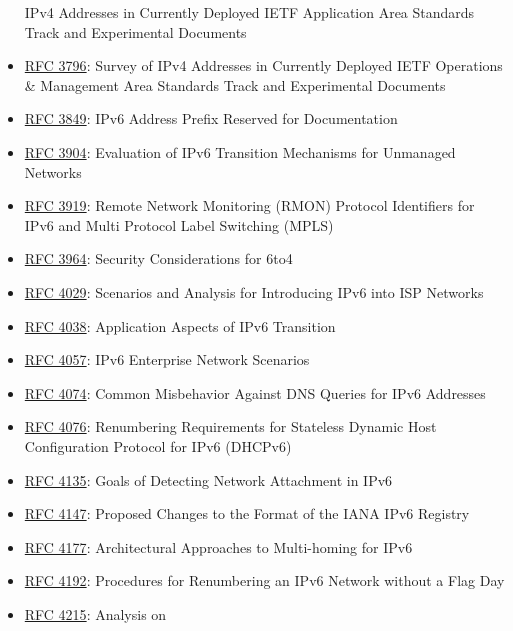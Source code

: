 \documentclass[
]{article}
\begin{document}
\begin{itemize}
  IPv4 Addresses in Currently Deployed IETF Application Area Standards
  Track and Experimental Documents
\item
  \href{https://www.rfc-editor.org/info/rfc3796}{RFC 3796}: Survey of
  IPv4 Addresses in Currently Deployed IETF Operations \& Management
  Area Standards Track and Experimental Documents
\item
  \href{https://www.rfc-editor.org/info/rfc3849}{RFC 3849}: IPv6 Address
  Prefix Reserved for Documentation
\item
  \href{https://www.rfc-editor.org/info/rfc3904}{RFC 3904}: Evaluation
  of IPv6 Transition Mechanisms for Unmanaged Networks
\item
  \href{https://www.rfc-editor.org/info/rfc3919}{RFC 3919}: Remote
  Network Monitoring (RMON) Protocol Identifiers for IPv6 and Multi
  Protocol Label Switching (MPLS)
\item
  \href{https://www.rfc-editor.org/info/rfc3964}{RFC 3964}: Security
  Considerations for 6to4
\item
  \href{https://www.rfc-editor.org/info/rfc4029}{RFC 4029}: Scenarios
  and Analysis for Introducing IPv6 into ISP Networks
\item
  \href{https://www.rfc-editor.org/info/rfc4038}{RFC 4038}: Application
  Aspects of IPv6 Transition
\item
  \href{https://www.rfc-editor.org/info/rfc4057}{RFC 4057}: IPv6
  Enterprise Network Scenarios
\item
  \href{https://www.rfc-editor.org/info/rfc4074}{RFC 4074}: Common
  Misbehavior Against DNS Queries for IPv6 Addresses
\item
  \href{https://www.rfc-editor.org/info/rfc4076}{RFC 4076}: Renumbering
  Requirements for Stateless Dynamic Host Configuration Protocol for
  IPv6 (DHCPv6)
\item
  \href{https://www.rfc-editor.org/info/rfc4135}{RFC 4135}: Goals of
  Detecting Network Attachment in IPv6
\item
  \href{https://www.rfc-editor.org/info/rfc4147}{RFC 4147}: Proposed
  Changes to the Format of the IANA IPv6 Registry
\item
  \href{https://www.rfc-editor.org/info/rfc4177}{RFC 4177}:
  Architectural Approaches to Multi-homing for IPv6
\item
  \href{https://www.rfc-editor.org/info/rfc4192}{RFC 4192}: Procedures
  for Renumbering an IPv6 Network without a Flag Day
\item
  \href{https://www.rfc-editor.org/info/rfc4215}{RFC 4215}: Analysis on

\end{itemize}
\end{document}
